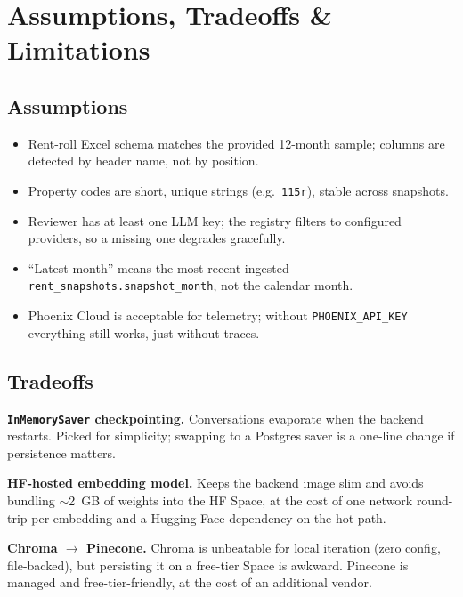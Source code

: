 \documentclass[11pt,a4paper]{article}
\begin{document}
\section{Assumptions, Tradeoffs \& Limitations}

\subsection{Assumptions}

\begin{itemize}
  \item Rent-roll Excel schema matches the provided 12-month sample; columns are detected by header name, not by position.
  \item Property codes are short, unique strings (e.g.\ \texttt{115r}), stable across snapshots.
  \item Reviewer has at least one LLM key; the registry filters to configured providers, so a missing one degrades gracefully.
  \item ``Latest month'' means the most recent ingested \texttt{rent\_snapshots.snapshot\_month}, not the calendar month.
  \item Phoenix Cloud is acceptable for telemetry; without \texttt{PHOENIX\_API\_KEY} everything still works, just without traces.
\end{itemize}

\subsection{Tradeoffs}

\begin{tradeoffbox}
\textbf{\texttt{InMemorySaver} checkpointing.} Conversations evaporate when the backend
restarts. Picked for simplicity; swapping to a Postgres saver is a one-line change if
persistence matters.
\end{tradeoffbox}

\begin{tradeoffbox}
\textbf{HF-hosted embedding model.} Keeps the backend image slim and avoids bundling
$\sim$2~GB of weights into the HF Space, at the cost of one network round-trip per
embedding and a Hugging Face dependency on the hot path.
\end{tradeoffbox}

\begin{tradeoffbox}
\textbf{Chroma $\rightarrow$ Pinecone.} Chroma is unbeatable for local iteration (zero
config, file-backed), but persisting it on a free-tier Space is awkward. Pinecone is
managed and free-tier-friendly, at the cost of an additional vendor.
\end{tradeoffbox}
\end{document}
